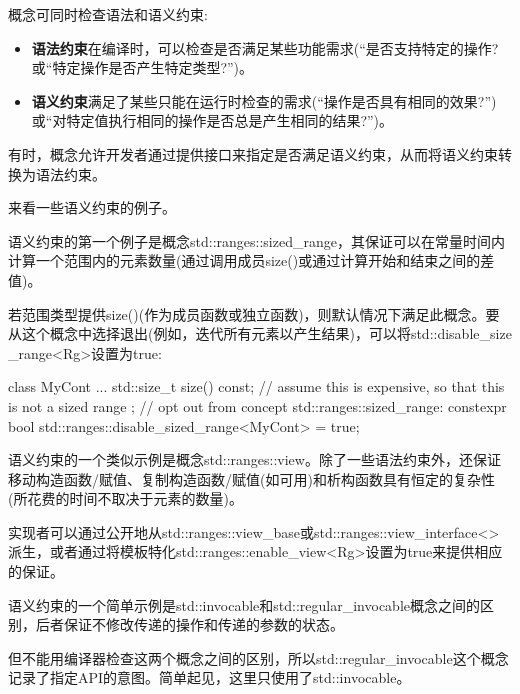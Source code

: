 
概念可同时检查语法和语义约束:

\begin{itemize}
\item
\textbf{语法约束}在编译时，可以检查是否满足某些功能需求(“是否支持特定的操作?或“特定操作是否产生特定类型?”)。

\item
\textbf{语义约束}满足了某些只能在运行时检查的需求(“操作是否具有相同的效果?”)或“对特定值执行相同的操作是否总是产生相同的结果?”)。
\end{itemize}

有时，概念允许开发者通过提供接口来指定是否满足语义约束，从而将语义约束转换为语法约束。


来看一些语义约束的例子。


语义约束的第一个例子是概念std::ranges::sized\_range，其保证可以在常量时间内计算一个范围内的元素数量(通过调用成员size()或通过计算开始和结束之间的差值)。

若范围类型提供size()(作为成员函数或独立函数)，则默认情况下满足此概念。要从这个概念中选择退出(例如，迭代所有元素以产生结果)，可以将std::disable\_size \_range<Rg>设置为true:

\begin{cpp}
class MyCont {
	...
	std::size_t size() const; // assume this is expensive, so that this is not a sized range
};
// opt out from concept std::ranges::sized_range:
constexpr bool std::ranges::disable_sized_range<MyCont> = true;
\end{cpp}


语义约束的一个类似示例是概念std::ranges::view。除了一些语法约束外，还保证移动构造函数/赋值、复制构造函数/赋值(如可用)和析构函数具有恒定的复杂性(所花费的时间不取决于元素的数量)。

实现者可以通过公开地从std::ranges::view\_base或std::ranges::view\_interface<>派生，或者通过将模板特化std::ranges::enable\_view<Rg>设置为true来提供相应的保证。


语义约束的一个简单示例是std::invocable和std::regular\_invocable概念之间的区别，后者保证不修改传递的操作和传递的参数的状态。

但不能用编译器检查这两个概念之间的区别，所以std::regular\_invocable这个概念记录了指定API的意图。简单起见，这里只使用了std::invocable。

